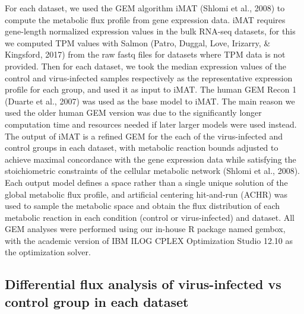 \documentclass[12pt,twoside,openany,\mydriver]{thesis}  %
\begin{document}
For each dataset, we used the GEM algorithm iMAT (Shlomi et al., 2008) to compute the metabolic flux profile from gene expression data. iMAT requires gene-length normalized expression values in the bulk RNA-seq datasets, for this we computed TPM values with Salmon (Patro, Duggal, Love, Irizarry, \& Kingsford, 2017) from the raw fastq files for datasets where TPM data is not provided. Then for each dataset, we took the median expression values of the control and virus-infected samples respectively as the representative expression profile for each group, and used it as input to iMAT. The human GEM Recon 1 (Duarte et al., 2007) was used as the base model to iMAT. The main reason we used the older human GEM version was due to the significantly longer computation time and resources needed if later larger models were used instead. The output of iMAT is a refined GEM for the each of the virus-infected and control groups in each dataset, with metabolic reaction bounds adjusted to achieve maximal concordance with the gene expression data while satisfying the stoichiometric constraints of the cellular metabolic network (Shlomi et al., 2008). Each output model defines a space rather than a single unique solution of the global metabolic flux profile, and artificial centering hit-and-run (ACHR) was used to sample the metabolic space and obtain the flux distribution of each metabolic reaction in each condition (control or virus-infected) and dataset. All GEM analyses were performed using our in-house R package named gembox, with the academic version of IBM ILOG CPLEX Optimization Studio 12.10 as the optimization solver.

\hypertarget{differential-flux-analysis-of-virus-infected-vs-control-group-in-each-dataset}{%
\subsection{Differential flux analysis of virus-infected vs control group in each dataset}\label{differential-flux-analysis-of-virus-infected-vs-control-group-in-each-dataset}}
\end{document}

